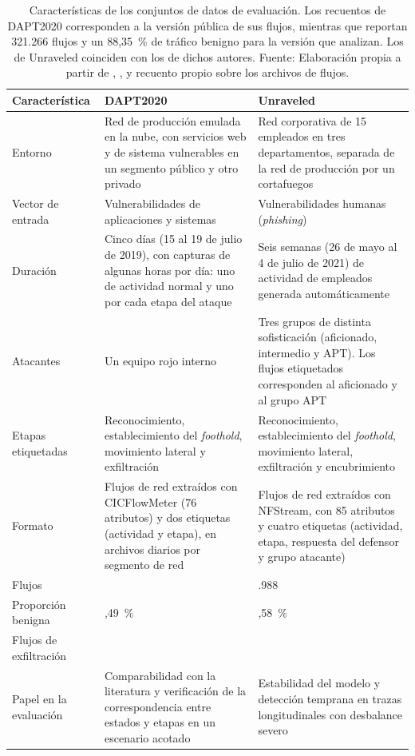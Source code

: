 \begin{table}[h!]
\centering
\small
\renewcommand{\arraystretch}{1.25}
\begin{tabularx}{\textwidth}{|>{\raggedright\arraybackslash}p{3cm}|>{\raggedright\arraybackslash}X|>{\raggedright\arraybackslash}X|}
\hline
\textbf{Característica} & \textbf{DAPT2020} & \textbf{Unraveled} \\ \hline
Entorno & Red de producción emulada en la nube, con servicios web y de sistema vulnerables en un segmento público y otro privado & Red corporativa de 15 empleados en tres departamentos, separada de la red de producción por un cortafuegos \\ \hline
Vector de entrada & Vulnerabilidades de aplicaciones y sistemas & Vulnerabilidades humanas (\textit{phishing}) \\ \hline
Duración & Cinco días (15 al 19 de julio de 2019), con capturas de algunas horas por día: uno de actividad normal y uno por cada etapa del ataque & Seis semanas (26 de mayo al 4 de julio de 2021) de actividad de empleados generada automáticamente \\ \hline
Atacantes & Un equipo rojo interno & Tres grupos de distinta sofisticación (aficionado, intermedio y APT). Los flujos etiquetados corresponden al aficionado y al grupo APT \\ \hline
Etapas etiquetadas & Reconocimiento, establecimiento del \textit{foothold}, movimiento lateral y exfiltración & Reconocimiento, establecimiento del \textit{foothold}, movimiento lateral, exfiltración y encubrimiento \\ \hline
Formato & Flujos de red extraídos con CICFlowMeter (76 atributos) y dos etiquetas (actividad y etapa), en archivos diarios por segmento de red & Flujos de red extraídos con NFStream, con 85 atributos y cuatro etiquetas (actividad, etapa, respuesta del defensor y grupo atacante) \\ \hline
Flujos & 86.691 & 6.863.988 \\ \hline
Proporción benigna & 73,49~\% & 98,58~\% \\ \hline
Flujos de exfiltración & 15 & 7.522 \\ \hline
Papel en la evaluación & Comparabilidad con la literatura y verificación de la correspondencia entre estados y etapas en un escenario acotado & Estabilidad del modelo y detección temprana en trazas longitudinales con desbalance severo \\ \hline
\end{tabularx}
\caption[Características de los conjuntos de datos de evaluación.]{Características de los conjuntos de datos de evaluación. Los recuentos de DAPT2020 corresponden a la versión pública de sus flujos, mientras que \textcite{mamun_limitations_2024} reportan 321.266 flujos y un 88,35~\% de tráfico benigno para la versión que analizan. Los de Unraveled coinciden con los de dichos autores. Fuente: Elaboración propia a partir de \textcite{myneni2020dapt2020}, \textcite{myneni2023unraveled}, \textcite{mamun_limitations_2024} y recuento propio sobre los archivos de flujos.}
\label{tab:datasets_eval}
\end{table}
\FloatBarrier

